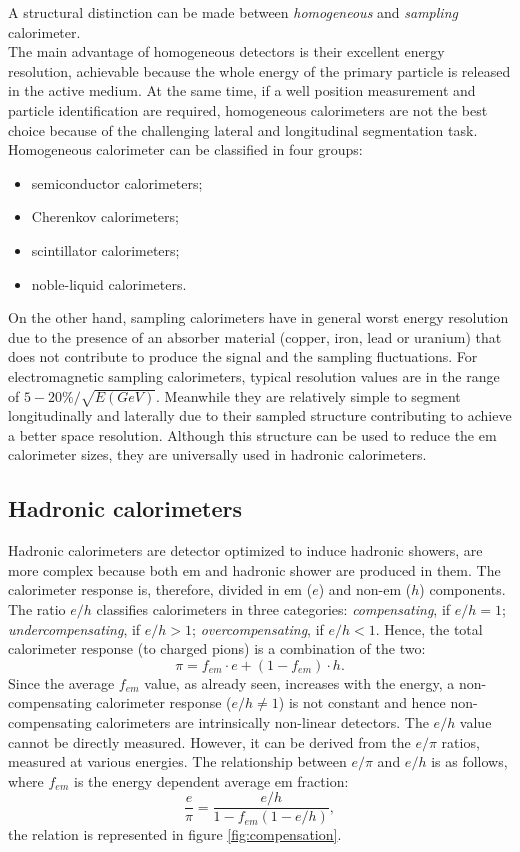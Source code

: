 A structural distinction can be made between \textit{homogeneous} and \textit{sampling} calorimeter.\\
The main advantage of homogeneous detectors is their excellent energy resolution, achievable because the whole energy of the primary particle is released in the active medium. At the same time, if a well position measurement and particle identification are required, homogeneous calorimeters are not the best choice because of the challenging lateral and longitudinal segmentation task. 
Homogeneous calorimeter can be classified in four groups:
\begin{itemize}
    \item semiconductor calorimeters;
    \item Cherenkov calorimeters;
    \item scintillator calorimeters;
    \item noble-liquid calorimeters.
\end{itemize}

On the other hand, sampling calorimeters have in general worst energy resolution due to the presence of an absorber material (copper, iron, lead or uranium) that does not contribute to produce the signal and the sampling fluctuations. For electromagnetic sampling calorimeters, typical resolution values are in the range of $5-20 \% / \sqrt{E(GeV)}$. Meanwhile they are relatively simple to segment longitudinally and laterally due to their sampled structure contributing to achieve a better space resolution. Although this structure can be used to reduce the em calorimeter sizes, they are universally used in hadronic calorimeters.

\subsection*{Hadronic calorimeters}
Hadronic calorimeters are detector optimized to induce hadronic showers, are more complex because both em and hadronic shower are produced in them. The calorimeter response is, therefore, divided in em ($e$) and non-em ($h$) components. The ratio $e/h$ classifies calorimeters in three categories: \textit{compensating}, if $e/h=1$; \textit{undercompensating}, if $e/h>1$; \textit{overcompensating}, if $e/h<1$. Hence, the total calorimeter response (to charged pions) is a combination of the two:
\begin{equation}
    \pi = f_{em} \cdot e + (1- f_{em}) \cdot h.
\end{equation}
Since the average $f_{em}$ value, as already seen, increases with the energy, a non-compensating calorimeter response ($e/h \neq  1$) is not constant and hence non-compensating calorimeters are intrinsically non-linear detectors.
The $e/h$ value cannot be directly measured. However, it can be derived from the $e/\pi$ ratios, measured at various energies. The relationship between $e/\pi$ and $e/h$ is as follows, where $f_{em}$ is the energy dependent average em fraction:
\begin{equation}
    \frac{e}{\pi} = \frac{e/h}{1 - f_{em}(1-e/h)},
\end{equation}
the relation is represented in figure \ref{fig:compensation}.

